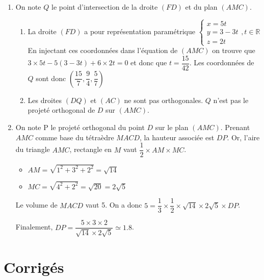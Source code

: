 \documentclass[11pt,fleqn, openany]{book} %
\begin{document}
\begin{solution}
\begin{enumerate}
\begin{enumerate}
\item On note $Q$ le point d'intersection de la droite $(FD)$ et du plan $(AMC)$. 
\begin{enumerate}
\item La droite $(FD)$ a pour représentation paramétrique $\left\{\begin{array}{l}x=5t \\ y = 3-3t \\ z=2t\end{array},t \in \mathbb{R} \right.$ En injectant ces coordonnées dans l'équation de $(AMC)$ on trouve que $3\times 5t -5(3-3t)+6 \times 2t=0$ et donc que $t=\dfrac{15}{42}$. Les coordonnées de $Q$ sont donc $\left(\dfrac{15}{7},\dfrac{9}{4},\dfrac{5}{7}\right)$
\item Les droites $(DQ)$ et $(AC)$ ne sont pas orthogonales. $Q$ n'est pas le projeté orthogonal de $D$ sur $(AMC)$.
\end{enumerate}
\item On note P le projeté orthogonal du point $D$ sur le plan $(AMC)$. Prenant $AMC$ comme base du tétraèdre $MACD$, la hauteur associée est $DP$.
Or, l'aire du triangle $AMC$, rectangle en $M$ vaut $\dfrac{1}{2} \times AM \times MC$. 
\begin{itemize}
\item $AM =\sqrt{1^2+3^2+2^2}=\sqrt{14}$
\item $MC=\sqrt{4^2+2^2}=\sqrt{20}=2\sqrt{5}$
\end{itemize}
Le volume de $MACD$ vaut 5. On a donc $5 =  \dfrac{1}{3} \times \dfrac{1}{2} \times \sqrt{14} \times 2\sqrt{5} \times DP$.

Finalement, $DP = \dfrac{5 \times 3 \times 2}{\sqrt{14} \times 2 \sqrt{5}}\simeq 1.8$.
\end{enumerate}\end{enumerate}
\end{solution}

\chapter{Corrigés}


\printsolutions[headings={false} ]
\end{document}
